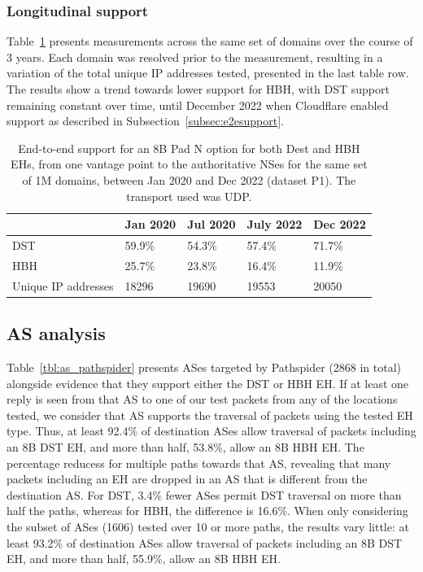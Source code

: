 \documentclass[conference]{IEEEtran}
\begin{document}
\subsubsection{Longitudinal support}

Table~\ref{tbl:longitudinal_support} presents measurements across the same set of domains over the course of 3 years. Each domain was resolved prior to the measurement, resulting in a variation of the total unique IP addresses tested, presented in the last table row. The results show a trend towards lower support for HBH, with DST support remaining constant over time, until December 2022 when Cloudflare enabled support as described in Subsection~\ref{subsec:e2esupport}.

\begin{table}
\begin{tabular}{l|l|l|l|l}
                    & Jan 2020 & Jul 2020 & July 2022 & Dec 2022 \\
\hline
DST & 59.9\%   & 54.3\%   & 57.4\%    & 71.7\%   \\
HBH  & 25.7\%   & 23.8\%   & 16.4\%    & 11.9\%   \\
\hline
Unique IP addresses & 18296    & 19690    & 19553     & 20050   
\end{tabular}
\label{tbl:longitudinal_support}
\caption{End-to-end support for an 8B Pad N option for both Dest and HBH EHs, from one vantage point to the authoritative NSes for the same set of 1M domains, between Jan 2020 and Dec 2022 (dataset P1). The transport used was UDP.}
\end{table}

\subsection{AS analysis }



Table~\ref{tbl:as_pathspider} presents ASes targeted by Pathspider (2868 in total) alongside evidence that they support either the DST or HBH EH.
If at least one reply is seen from that AS to one of our test packets from any of the locations tested, we consider that AS supports the traversal of packets using the tested EH type. Thus, at least 92.4\% of destination ASes allow traversal of packets including an 8B DST EH, and more than half, 53.8\%, allow an 8B HBH EH. The percentage reducess for multiple paths towards that AS, revealing that many packets including an EH are dropped in an AS  that is different from the destination AS. For DST, 3.4\% fewer ASes permit DST traversal on more than half the paths, whereas for HBH, the difference is 16.6\%.
When only considering the subset of ASes (1606) tested over 10 or more paths, the results vary little: at least 93.2\% of destination ASes allow traversal of packets including an 8B DST EH, and more than half, 55.9\%, allow an 8B HBH EH.
\end{document}
